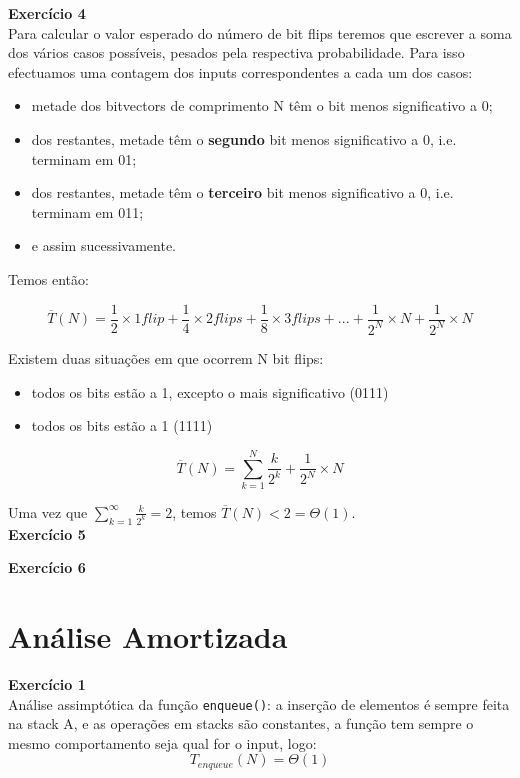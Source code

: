 \documentclass[a4paper,11pt]{article}
\begin{document}
	\noindent \textbf{Exercício 4}\\
	
	\noindent Para calcular o valor esperado do número de bit flips teremos que escrever a soma dos vários casos possíveis, pesados pela respectiva probabilidade. Para isso efectuamos uma contagem dos inputs correspondentes a cada um dos casos:
	
	\begin{itemize}
		\item metade dos bitvectors de comprimento N têm o bit menos significativo a 0;
		\item dos restantes, metade têm o \textbf{segundo} bit menos significativo a 0, i.e. terminam em 01;
		\item dos restantes, metade têm o \textbf{terceiro} bit menos significativo a 0, i.e. terminam em 011;
		\item e assim sucessivamente.
	\end{itemize}
	
	\noindent Temos então:
	
	\[
		\overline{T}(N) = \frac{1}{2} \times 1 flip + \frac{1}{4} \times 2 flips + \frac{1}{8} \times 3 flips + ... + \frac{1}{2^N} \times N + \frac{1}{2^N} \times N
	\]
	
	\noindent Existem duas situações em que ocorrem N bit flips:
	
	\begin{itemize}
		\item todos os bits estão a 1, excepto o mais significativo (0111)
		\item todos os bits estão a 1 (1111)
	\end{itemize}
	\[
		\overline{T}(N) = \sum_{k=1}^{N} \frac{k}{2^k} + \frac{1}{2^N} \times N
	\]
	
	\noindent Uma vez que $ \sum_{k=1}^{\infty} \frac{k}{2^k} = 2 $, temos $ \overline{T}(N) < 2 = \Theta(1) $.\\
	
	\noindent \textbf{Exercício 5}
	
	\noindent \textbf{Exercício 6}
	
	
	\section{Análise Amortizada}
	
	\noindent \textbf{Exercício 1}\\
	
	\noindent Análise assimptótica da função \texttt{enqueue()}: a inserção de elementos é sempre feita na stack A, e as operações em stacks são constantes, a função tem sempre o mesmo comportamento seja qual for o input, logo:
	\[
		T_{enqueue}(N) = \Theta(1)
	\]
	
\end{document}
